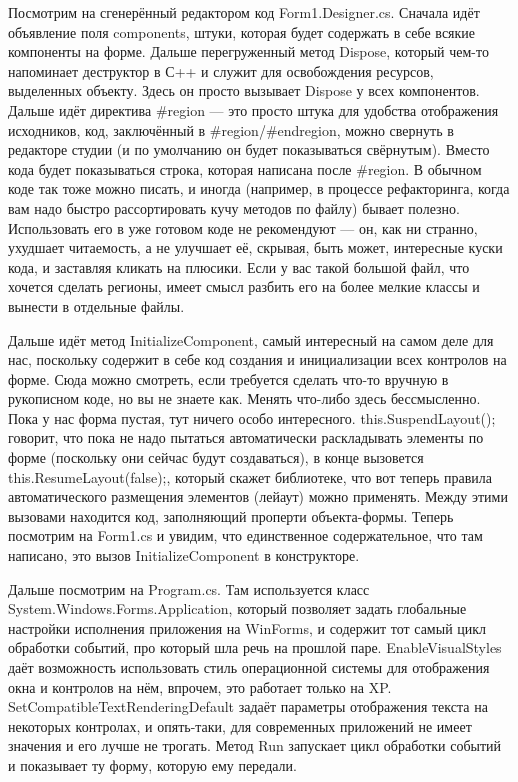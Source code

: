 \documentclass[a5paper]{article}
\begin{document}
Посмотрим на сгенерённый редактором код Form1.Designer.cs. Сначала идёт объявление поля components, штуки, которая будет содержать в себе всякие компоненты на форме. Дальше перегруженный метод Dispose, который чем-то напоминает деструктор в С++ и служит для освобождения ресурсов, выделенных объекту. Здесь он просто вызывает Dispose у всех компонентов. Дальше идёт директива \#region --- это просто штука для удобства отображения исходников, код, заключённый в \#region/\#endregion, можно свернуть в редакторе студии (и по умолчанию он будет показываться свёрнутым). Вместо кода будет показываться строка, которая написана после \#region. В обычном коде так тоже можно писать, и иногда (например, в процессе рефакторинга, когда вам надо быстро рассортировать кучу методов по файлу) бывает полезно. Использовать его в уже готовом коде не рекомендуют --- он, как ни странно, ухудшает читаемость, а не улучшает её, скрывая, быть может, интересные куски кода, и заставляя кликать на плюсики. Если у вас такой большой файл, что хочется сделать регионы, имеет смысл разбить его на более мелкие классы и вынести в отдельные файлы.

Дальше идёт метод InitializeComponent, самый интересный на самом деле для нас, поскольку содержит в себе код создания и инициализации всех контролов на форме. Сюда можно смотреть, если требуется сделать что-то вручную в рукописном коде, но вы не знаете как. Менять что-либо здесь бессмысленно. Пока у нас форма пустая, тут ничего особо интересного. this.SuspendLayout(); говорит, что пока не надо пытаться автоматически раскладывать элементы по форме (поскольку они сейчас будут создаваться), в конце вызовется this.ResumeLayout(false);, который скажет библиотеке, что вот теперь правила автоматического размещения элементов (лейаут) можно применять. Между этими вызовами находится код, заполняющий проперти объекта-формы. Теперь посмотрим на Form1.cs и увидим, что единственное содержательное, что там написано, это вызов InitializeComponent в конструкторе. 

Дальше посмотрим на Program.cs. Там используется класс System.Windows.Forms.Application, который позволяет задать глобальные настройки исполнения приложения на WinForms, и содержит тот самый цикл обработки событий, про который шла речь на прошлой паре. EnableVisualStyles даёт возможность использовать стиль операционной системы для отображения окна и контролов на нём, впрочем, это работает только на XP. SetCompatibleTextRenderingDefault задаёт параметры отображения текста на некоторых контролах, и опять-таки, для современных приложений не имеет значения и его лучше не трогать. Метод Run запускает цикл обработки событий и показывает ту форму, которую ему передали.
\end{document}
